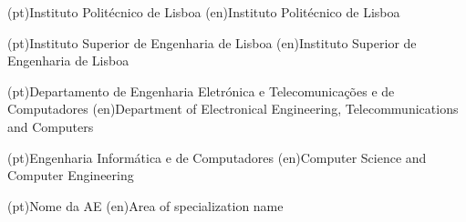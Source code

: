 
%



\ncuniversity*(pt){Instituto Politécnico de Lisboa}
\ncuniversity*(en){Instituto Politécnico de Lisboa}

\ncschool*(pt){Instituto Superior de Engenharia de Lisboa}
\ncschool*(en){Instituto Superior de Engenharia de Lisboa}

\ncdepartment*(pt){Departamento de Engenharia Eletrónica e Telecomunicações e de Computadores}
\ncdepartment*(en){Department of Electronical Engineering, Telecommunications and Computers}



\ncmajorfield(pt){Engenharia Informática e de Computadores}
\ncmajorfield(en){Computer Science and Computer Engineering}




\ncspecialization(pt){Nome da AE}
\ncspecialization(en){Area of specialization name}

